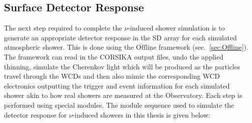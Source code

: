 \subsection{Surface Detector Response}
\label{subsec:sim_SD_resp}

The next step required to complete the $\nu$-induced shower simulation is to generate an appropriate detector response in the SD array for each simulated atmospheric shower. This is done using the $\mathrm{\overline{Off}\underline{line}}$ framework (sec.~\ref{sec:Offline}). The framework can read in the CORSIKA output files, undo the applied thinning, simulate the Cherenkov light which will be produced as the particles travel through the WCDs and then also mimic the corresponding WCD electronics outputting the trigger and event information for each simulated shower akin to how real showers are measured at the Observatory. Each step is performed using special modules. The module sequence used to simulate the detector response for $\nu$-induced showers in this thesis is given below: 


